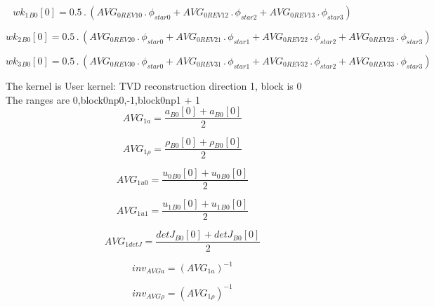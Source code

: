 \documentclass{article}
\begin{document}
\begin{dmath}{wk_{1}{_{B0}}}[{0}] = 0.5 \,.\, \left(AVG_{0 REV 10} \,.\, \phi_{star 0} + AVG_{0 REV 12} \,.\, \phi_{star 2} + AVG_{0 REV 13} \,.\, \phi_{star 3}\right)\end{dmath}

\begin{dmath}{wk_{2}{_{B0}}}[{0}] = 0.5 \,.\, \left(AVG_{0 REV 20} \,.\, \phi_{star 0} + AVG_{0 REV 21} \,.\, \phi_{star 1} + AVG_{0 REV 22} \,.\, \phi_{star 2} + AVG_{0 REV 23} \,.\, \phi_{star 3}\right)\end{dmath}

\begin{dmath}{wk_{3}{_{B0}}}[{0}] = 0.5 \,.\, \left(AVG_{0 REV 30} \,.\, \phi_{star 0} + AVG_{0 REV 31} \,.\, \phi_{star 1} + AVG_{0 REV 32} \,.\, \phi_{star 2} + AVG_{0 REV 33} \,.\, \phi_{star 3}\right)\end{dmath}

\noindent The kernel is User kernel: TVD reconstruction direction 1, block is 0\\\noindent The ranges are 0,block0np0,-1,block0np1 + 1\\\begin{dmath}AVG_{1 a} = \frac{{a{_{B0}}}[{0}] + {a{_{B0}}}[{0}]}{2}\end{dmath}

\begin{dmath}AVG_{1 \rho} = \frac{{\rho{_{B0}}}[{0}] + {\rho{_{B0}}}[{0}]}{2}\end{dmath}

\begin{dmath}AVG_{1 u0} = \frac{{u_{0}{_{B0}}}[{0}] + {u_{0}{_{B0}}}[{0}]}{2}\end{dmath}

\begin{dmath}AVG_{1 u1} = \frac{{u_{1}{_{B0}}}[{0}] + {u_{1}{_{B0}}}[{0}]}{2}\end{dmath}

\begin{dmath}AVG_{1 detJ} = \frac{{detJ{_{B0}}}[{0}] + {detJ{_{B0}}}[{0}]}{2}\end{dmath}

\begin{dmath}inv_{AVG a} = \left(AVG_{1 a} \right)^{-1}\end{dmath}

\begin{dmath}inv_{AVG \rho} = \left(AVG_{1 \rho} \right)^{-1}\end{dmath}
\end{document}
